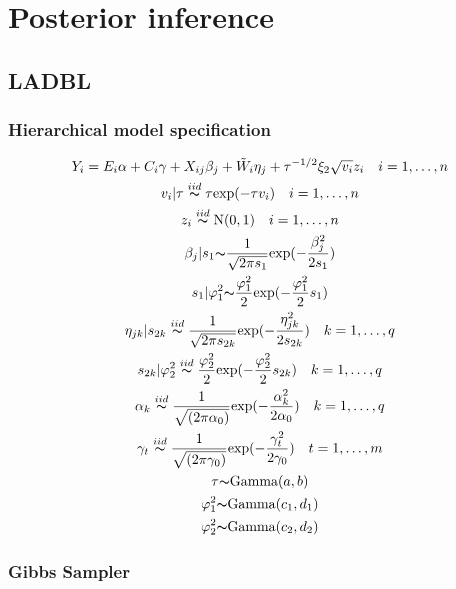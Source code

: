 \documentclass[12pt]{article}
\begin{document}
\clearpage
\section{Posterior inference}


\subsection{LADBL}
\subsubsection{Hierarchical model specification}

\begin{gather*}
Y_{i} = E_{i}\alpha + C_{i}\gamma + X_{ij}\beta_{j} + \tilde{W}_{i}\eta_{j} + \tau^{-1/2}\xi_{2}\sqrt{v_{i}}z_{i} \quad i = 1, \dots,n\\
v_{i}|\tau \stackrel{iid}{\thicksim}\tau \text{exp}(- \tau v_{i}) \quad i = 1, \dots,n\\
z_{i} \stackrel{iid}{\thicksim}\text{N}(0,1) \quad i = 1, \dots,n\\
\beta_j|s_{1}{\thicksim}\frac{1}{\sqrt{2\pi s_{1}}}\text{exp}(-\frac{\beta_{j}^{2}}{2 s_{1}})\\
s_{1}|{\varphi_{1}^{2}}{\thicksim}\frac{\varphi_{1}^{2}}{2}\text{exp}({-\frac{\varphi_{1}^{2}}{2}}s_{1})\\
\eta_{jk}|s_{2k} \stackrel{iid}{\thicksim}\frac{1}{\sqrt{2\pi s_{2k}}}\text{exp}(-\frac{\eta_{jk}^2}{2 s_{2k}}) \quad k=1,\dots, q\\
s_{2k}|{\varphi_{2}^{2}}\stackrel{iid}{\thicksim}\frac{\varphi_{2}^{2}}{2}\text{exp}({-\frac{\varphi_{2}^{2}}{2}}s_{2k}) \quad k=1,\dots, q\\
\alpha_k \stackrel{iid}{\thicksim}\frac{1}{\sqrt{(2\pi \alpha_0)}}\text{exp}(-\frac{\alpha_{k}^2}{2\alpha_0})\quad k = 1,\dots, q\\
\gamma_t \stackrel{iid}{\thicksim}\frac{1}{\sqrt{(2\pi \gamma_0)}}\text{exp}(-\frac{\gamma_{t}^2}{2\gamma_0}) \quad t = 1, \dots, m\\
\tau {\thicksim}\text{Gamma}(a,b)\\
\varphi_1^2{\thicksim}\text{Gamma}(c_1,d_1)\\
\varphi_2^2{\thicksim}\text{Gamma}(c_2,d_2)\\
\end{gather*}

\subsubsection{Gibbs Sampler}
\end{document}
